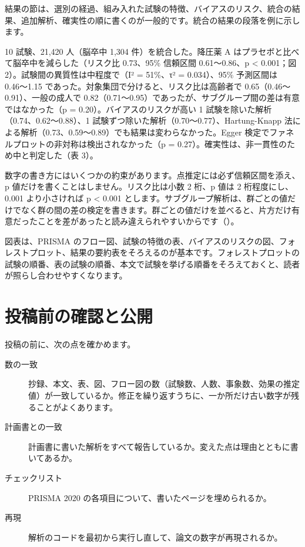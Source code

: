 結果の節は、選別の経過、組み入れた試験の特徴、バイアスのリスク、統合の結果、追加解析、確実性の順に書くのが一般的です。統合の結果の段落を例に示します。

\begin{KKfbox9ao}[結果の例]
10 試験、21,420 人（脳卒中 1,304 件）を統合した。降圧薬 A はプラセボと比べて脳卒中を減らした（リスク比 0.73、95\% 信頼区間 0.61〜0.86、p < 0.001；図 2）。試験間の異質性は中程度で（I² = 51\%、τ² = 0.034）、95\% 予測区間は 0.46〜1.15 であった。対象集団で分けると、リスク比は高齢者で 0.65（0.46〜0.91）、一般の成人で 0.82（0.71〜0.95）であったが、サブグループ間の差は有意ではなかった（p = 0.20）。バイアスのリスクが高い 1 試験を除いた解析（0.74、0.62〜0.88）、1 試験ずつ除いた解析（0.70〜0.77）、Hartung-Knapp 法による解析（0.73、0.59〜0.89）でも結果は変わらなかった。Egger 検定でファネルプロットの非対称は検出されなかった（p = 0.27）。確実性は、非一貫性のため中と判定した（表 3）。
\end{KKfbox9ao}

数字の書き方にはいくつかの約束があります。点推定には必ず信頼区間を添え、p 値だけを書くことはしません。リスク比は小数 2 桁、p 値は 2 桁程度にし、0.001 より小さければ p < 0.001 とします。サブグループ解析は、群ごとの値だけでなく群の間の差の検定を書きます。群ごとの値だけを並べると、片方だけ有意だったことを差があったと読み違えられやすいからです（）。

図表は、PRISMA のフロー図、試験の特徴の表、バイアスのリスクの図、フォレストプロット、結果の要約表をそろえるのが基本です。フォレストプロットの試験の順番、表の試験の順番、本文で試験を挙げる順番をそろえておくと、読者が照らし合わせやすくなります。

\section{投稿前の確認と公開}
\label{sec:08-4}

投稿の前に、次の点を確かめます。

\begin{description}
\item[数の一致] 抄録、本文、表、図、フロー図の数（試験数、人数、事象数、効果の推定値）が一致しているか。修正を繰り返すうちに、一か所だけ古い数字が残ることがよくあります。
\item[計画書との一致] 計画書に書いた解析をすべて報告しているか。変えた点は理由とともに書いてあるか。
\item[チェックリスト] PRISMA 2020 の各項目について、書いたページを埋められるか。
\item[再現] 解析のコードを最初から実行し直して、論文の数字が再現されるか。
\end{description}

